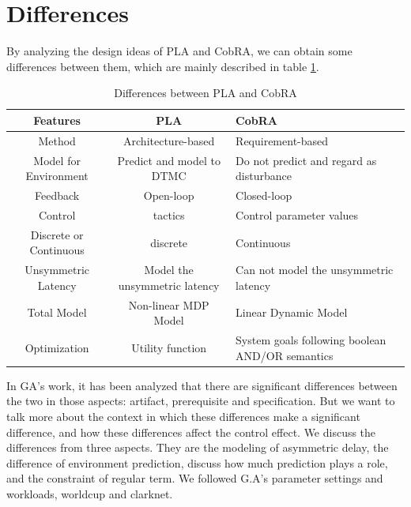 \documentclass[sigconf]{acmart}
\begin{document}
\section{Differences}
By analyzing the design ideas of PLA  and CobRA, we can obtain some differences between them, which are mainly described in table \ref{tab:differences}.
\begin{table}
	\caption{Differences between PLA and CobRA}
	\label{tab:differences}
	\begin{tabular}{ccl}
		\toprule
		Features&PLA&CobRA\\
		\midrule
		Method & Architecture-based& Requirement-based\\
		Model for Environment & Predict and model to DTMC
		& Do not predict and regard as disturbance 
		\\
		Feedback & Open-loop
		 & Closed-loop\\
		Control  & tactics& Control parameter values
		\\
		Discrete or Continuous&discrete&Continuous\\
		Unsymmetric Latency&Model the unsymmetric latency&Can not model the unsymmetric latency
		\\
		Total Model&Non-linear MDP Model&Linear Dynamic Model\\
		Optimization&Utility function&System goals following boolean AND/OR semantics\\
		
		\bottomrule
	\end{tabular}
\end{table}
In GA's work, it has been analyzed that there are significant differences between the two in those aspects: artifact, prerequisite and specification.
But we want to talk more about the context in which these differences make a significant difference, and how these differences affect the control effect.
We discuss the differences from three aspects. They are the modeling of asymmetric delay, the difference of environment prediction, discuss how much prediction plays a role, and the constraint of regular term. We followed G.A's parameter settings and workloads, worldcup\cite{worldcup} and clarknet\cite{clarknet}. 
\end{document}
